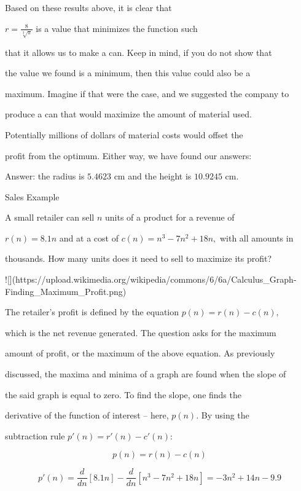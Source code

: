 Based on these results above, it is clear that

$r=\frac{8}{\sqrt[3]{\pi}}$ is a value that minimizes the function such

that it allows us to make a can. Keep in mind, if you do not show that

the value we found is a minimum, then this value could also be a

maximum. Imagine if that were the case, and we suggested the company to

produce a can that would maximize the amount of material used.

Potentially millions of dollars of material costs would offset the

profit from the optimum. Either way, we have found our answers:



Answer: the radius is $5.4623\text{ cm}$ and the height is $10.9245\text{ cm}.$



Sales Example



A small retailer can sell $n$ units of a product for a revenue of

$r(n)=8.1n$ and at a cost of $c(n)=n^3-7n^2+18n,$ with all amounts in

thousands. How many units does it need to sell to maximize its profit?



![](https://upload.wikimedia.org/wikipedia/commons/6/6a/Calculus_Graph-Finding_Maximum_Profit.png)



The retailer's profit is defined by the equation $p(n)=r(n)-c(n),$

which is the net revenue generated. The question asks for the maximum

amount of profit, or the maximum of the above equation. As previously

discussed, the maxima and minima of a graph are found when the slope of

the said graph is equal to zero. To find the slope, one finds the

derivative of the function of interest -- here, $p(n).$ By using the

subtraction rule $p'(n)=r'(n)-c'(n)$:



$$p(n)=r(n)-c(n)$$



$$p'(n)=\frac{d}{dn}[8.1n]-\frac{d}{dn}\left[n^3-7n^2+18n\right]=-3n^2+14n-9.9$$



